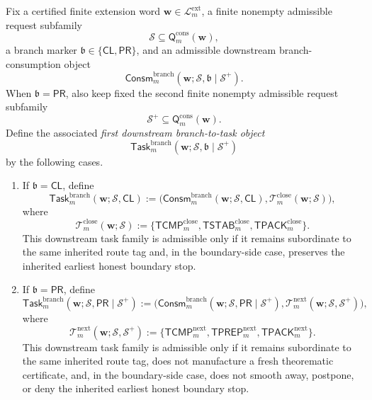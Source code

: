 \begin{definition}
\label{def:first-downstream-branch-to-task-object}
Fix a certified finite extension word \(\mathbf w\in\mathcal L^{\mathrm{ext}}_{m}\), a finite nonempty admissible request subfamily
\[
 \mathcal S \subseteq \mathsf{Q}^{\mathrm{cons}}_{m}(\mathbf w),
\]
a branch marker \(\mathfrak b\in\{\mathsf{CL},\mathsf{PR}\}\), and an admissible downstream branch-consumption object
\[
 \mathsf{Consm}^{\mathrm{branch}}_{m}(\mathbf w;\mathcal S,\mathfrak b\mid\mathcal S^{+}).
\]
When \(\mathfrak b=\mathsf{PR}\), also keep fixed the second finite nonempty admissible request subfamily
\[
 \mathcal S^{+}\subseteq \mathsf{Q}^{\mathrm{cons}}_{m}(\mathbf w).
\]
Define the associated \emph{first downstream branch-to-task object}
\[
 \mathsf{Task}^{\mathrm{branch}}_{m}(\mathbf w;\mathcal S,\mathfrak b\mid\mathcal S^{+})
\]
by the following cases.
\begin{enumerate}[label=(
oman*)]
 \item If \(\mathfrak b=\mathsf{CL}\), define
\[
 \mathsf{Task}^{\mathrm{branch}}_{m}(\mathbf w;\mathcal S,\mathsf{CL})
 :=
 \bigl(\mathsf{Consm}^{\mathrm{branch}}_{m}(\mathbf w;\mathcal S,\mathsf{CL}),\mathcal T^{\mathrm{close}}_{m}(\mathbf w;\mathcal S)\bigr),
\]
where
\[
 \mathcal T^{\mathrm{close}}_{m}(\mathbf w;\mathcal S)
 :=
 \{\mathsf{TCMP}^{\mathrm{close}}_{m},\mathsf{TSTAB}^{\mathrm{close}}_{m},\mathsf{TPACK}^{\mathrm{close}}_{m}\}.
\]
This downstream task family is admissible only if it remains subordinate to the same inherited route tag and, in the boundary-side case, preserves the inherited earliest honest boundary stop.

 \item If \(\mathfrak b=\mathsf{PR}\), define
\[
 \mathsf{Task}^{\mathrm{branch}}_{m}(\mathbf w;\mathcal S,\mathsf{PR}\mid\mathcal S^{+})
 :=
 \bigl(\mathsf{Consm}^{\mathrm{branch}}_{m}(\mathbf w;\mathcal S,\mathsf{PR}\mid\mathcal S^{+}),\mathcal T^{\mathrm{next}}_{m}(\mathbf w;\mathcal S,\mathcal S^{+})\bigr),
\]
where
\[
 \mathcal T^{\mathrm{next}}_{m}(\mathbf w;\mathcal S,\mathcal S^{+})
 :=
 \{\mathsf{TCMP}^{\mathrm{next}}_{m},\mathsf{TPREP}^{\mathrm{next}}_{m},\mathsf{TPACK}^{\mathrm{next}}_{m}\}.
\]
This downstream task family is admissible only if it remains subordinate to the same inherited route tag, does not manufacture a fresh theorematic certificate, and, in the boundary-side case, does not smooth away, postpone, or deny the inherited earliest honest boundary stop.
\end{enumerate}
\end{definition}

